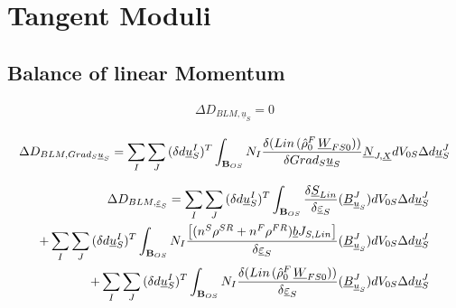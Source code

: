 \documentclass[12pt]{article}
\begin{document}
	\section{Tangent Moduli}
	\subsection{Balance of linear Momentum}
	\begin{equation*}
		\begin{aligned}
			\Delta D_{BLM, \underline{u}_{S}} = 0
		\end{aligned}
	\end{equation*}
	
	\begin{equation*}
		\Delta D_{BLM, {Grad_{S}}\underline{u}_{S}} = \sum_{I}\sum_{J}{(\delta d \underline{u}_{S}^{I})^{T}}\int_{\mathbf{B}_{OS}}{N_{I}}{\frac{\delta (Lin\hspace{0.5mm} ({\hat{\rho}_{0}^{F}}\hspace{0.5mm}{\underline{W}_{FS0}}))}{\delta {Grad_{S}}\underline{u}_{S} }}{\underline{N}_{{J},{\underline{X}}}}{dV_{0S}}{\Delta d\underline{u}_{S}^{J}}
	\end{equation*}
	
	\begin{equation*}
		\begin{aligned}
			\Delta D_{BLM, \underline{\varepsilon}_{S}} = \sum_{I}\sum_{J}{(\delta d \underline{u}_{S}^{I})^{T}}\int_{\mathbf{B}_{OS}}{\frac{\delta \underline{S}_{Lin}}{\delta \underline{\varepsilon}_{S}}}{({\underline{B}_{\underline{u}_{S}}^{J}})}{dV_{0S}}{\Delta d\underline{u}_{S}^{J}}\\ + \sum_{I}\sum_{J}{(\delta d \underline{u}_{S}^{I})^{T}}\int_{\mathbf{B}_{OS}}{N_{I}}{\frac{{\left[{({{n^S}{{\rho^{SR}}+{n^F}{\rho^{FR}}}})}  {\underline{b}}{J_{S, Lin}}    \right]}}{\delta \underline{\varepsilon}_{S}}}{({\underline{B}_{\underline{u}_{S}}^{J}})}{dV_{0S}}{\Delta d\underline{u}_{S}^{J}}\\+
			\sum_{I}\sum_{J}{(\delta d \underline{u}_{S}^{I})^{T}}\int_{\mathbf{B}_{OS}}{N_{I}}{{\frac{\delta (Lin\hspace{0.5mm} ({\hat{\rho}_{0}^{F}}\hspace{0.5mm}{\underline{W}_{FS0}}))}{\delta \underline{\varepsilon}_{S}}}}{({\underline{B}_{\underline{u}_{S}}^{J}})}{dV_{0S}}{\Delta d\underline{u}_{S}^{J}}
		\end{aligned}
	\end{equation*}
	
\end{document}
